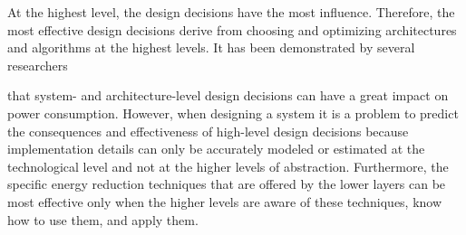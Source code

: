 At the highest level, the design decisions have the most influence.
Therefore, the most effective design decisions derive from choosing
and optimizing architectures and algorithms at the highest levels. It
has been demonstrated by several researchers \cite{63}

that system- and architecture-level design decisions can have a great
impact on power consumption. However, when designing a system it is a
problem to predict the consequences and effectiveness of high-level
design decisions because implementation details can only be
accurately modeled or estimated at the technological level and not at
the higher levels of abstraction. Furthermore, the specific energy
reduction techniques that are offered by the lower layers can be most
effective only when the higher levels are aware of these techniques,
know how to use them, and apply them.
 
